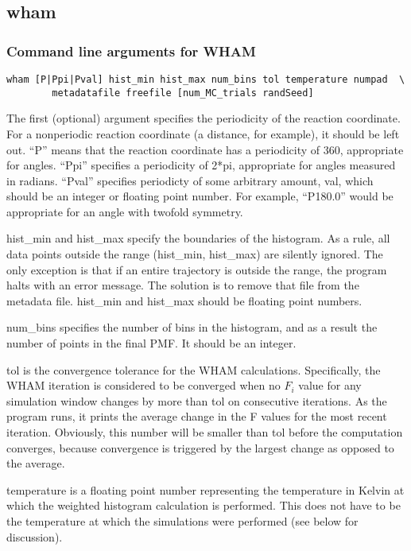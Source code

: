\documentclass[12pt]{article}
\begin{document}
\subsection{wham}

\subsubsection{Command line arguments for WHAM}

\begin{verbatim}
wham [P|Ppi|Pval] hist_min hist_max num_bins tol temperature numpad  \
        metadatafile freefile [num_MC_trials randSeed]
\end{verbatim}

The first (optional) argument specifies the periodicity of the reaction
coordinate.  For a nonperiodic reaction coordinate (a distance, for
example), it should be left out.  ``P'' means that the reaction coordinate
has a periodicity of 360, appropriate for angles. ``Ppi'' specifies a
periodicity of 2*pi, appropriate for angles measured in radians.  ``Pval''
specifies periodicty of some arbitrary amount, val, which should be an
integer or floating point number.  For example, ``P180.0'' would be
appropriate for an angle with twofold symmetry. 

hist\_min and hist\_max specify the boundaries of the histogram.  As a rule,
all data points outside the range (hist\_min, hist\_max) are silently
ignored.  The only exception is that if an entire trajectory is outside the
range, the program halts with an error message.  The solution is to remove
that file from the metadata file.  hist\_min and hist\_max should be floating
point numbers.

num\_bins specifies the number of bins in the histogram, and as a result the
number of points in the final PMF.  It should be an integer.

tol is the convergence tolerance for the WHAM calculations.  Specifically,
the WHAM iteration is considered to be converged when no $F_i$ value for any
simulation window changes by more than tol on consecutive iterations.  As
the program runs, it prints the average change in the F values for the most
recent iteration.  Obviously, this number will be smaller than tol
before the computation converges, because convergence is triggered by the
largest change as opposed to the average.

temperature is a floating point number representing the temperature in
Kelvin at which the weighted histogram calculation is performed.  This does
not have to be the temperature at which the simulations were performed (see
below for discussion).
\end{document}
